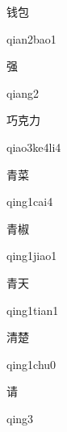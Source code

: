 \begin{verbete}{钱包}
\begin{pronuncia}{qian2bao1}
\end{pronuncia}
\end{verbete}

\begin{verbete}[qiang2]{强}
\begin{pronuncia}{qiang2}
\end{pronuncia}
\end{verbete}

\begin{verbete}[qiao3ke4li4]{巧克力}
\begin{pronuncia}{qiao3ke4li4}
\end{pronuncia}
\end{verbete}

\begin{verbete}{青菜}
\begin{pronuncia}{qing1cai4}
\end{pronuncia}
\end{verbete}

\begin{verbete}{青椒}
\begin{pronuncia}{qing1jiao1}
\end{pronuncia}
\end{verbete}

\begin{verbete}{青天}
\begin{pronuncia}{qing1tian1}
\end{pronuncia}
\end{verbete}

\begin{verbete}{清楚}
\begin{pronuncia}{qing1chu0}
\end{pronuncia}
\end{verbete}

\begin{verbete}[qing3]{请}
\begin{pronuncia}{qing3}
\end{pronuncia}
\end{verbete}

